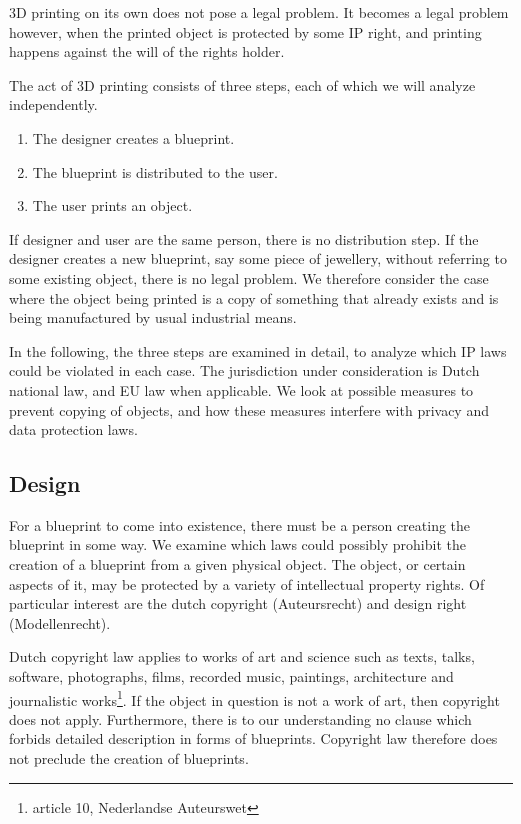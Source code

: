 3D printing on its own does not pose a legal problem.
It becomes a legal problem however, when the printed object is protected by 
some IP right, and printing happens against the will of the rights holder.

The act of 3D printing consists of three steps, each of which we will analyze 
independently.
\begin{enumerate}
  \item The designer creates a blueprint.
  \item The blueprint is distributed to the user.
  \item The user prints an object.
\end{enumerate}

If designer and user are the same person, there is no distribution step.
If the designer creates a new blueprint, say some piece of jewellery, without referring to some existing object, there is no legal problem.
We therefore consider the case where the object being printed is a copy of something that already exists and is being manufactured by usual industrial means.

In the following, the three steps are examined in detail, to analyze which IP laws could be violated in each case.
The jurisdiction under consideration is Dutch national law, and EU law when applicable.
We look at possible measures to prevent copying of objects, and how these measures interfere with privacy and data protection laws.

\subsection{Design}
For a blueprint to come into existence, there must be a person creating the blueprint in some way.
We examine which laws could possibly prohibit the creation of a blueprint from a given physical object.
The object, or certain aspects of it, may be protected by a variety of intellectual property rights.
Of particular interest are the dutch copyright (Auteursrecht) and design right (Modellenrecht).

Dutch copyright law applies to works of art and science such as texts, talks, software, photographs, films, recorded music, paintings, architecture and journalistic works\footnote{article 10, Nederlandse Auteurswet}.
If the object in question is not a work of art, then copyright does not apply. Furthermore, there is to our understanding no clause which forbids detailed description in forms of blueprints.
Copyright law therefore does not preclude the creation of blueprints.

